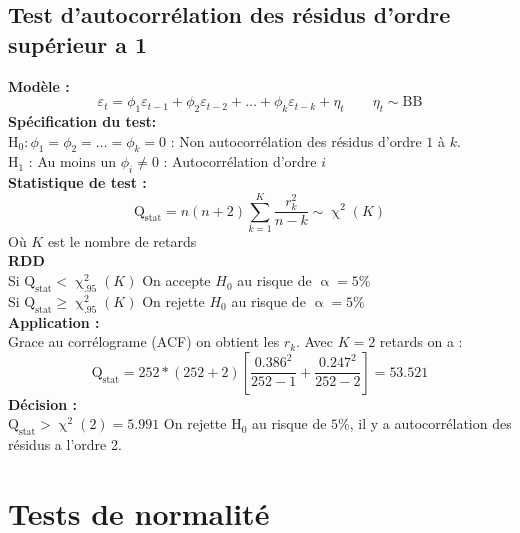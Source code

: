 \documentclass[A4paper]{article}
\begin{document}
\newpage
\subsection{Test d'autocorrélation des résidus d'ordre supérieur a 1}
\textbf{Modèle :}
\begin{equation*}
		\varepsilon_t = \phi_1 \varepsilon_{t-1} + \phi_2 \varepsilon_{t-2} + \ldots + \phi_k \varepsilon_{t-k} + \eta_t \qquad \eta_t \sim \text{BB}
\end{equation*}
\textbf{Spécification du test: } \\
H$_0 : \phi_1 = \phi_2 = \ldots = \phi_k = 0$ : Non autocorrélation des résidus d'ordre $1$ à $k$. \\
H$_1$ : Au moins un $\phi_i \neq 0$ : Autocorrélation d'ordre $i$ \\
\textbf{Statistique de test :}
\begin{equation*}
		\text{Q}_{\text{stat}} = n(n+2) \sum_{k=1}^K \frac{r_k^2}{n-k} \sim \upchi^2(K)
\end{equation*}
Où $K$ est le nombre de retards \\
 \textbf{RDD}\\
Si $\text{Q}_{\text{stat}} < \upchi^2_{.95}(K)$ On accepte $H_0$ au risque de $\upalpha = 5\%$\\
Si $\text{Q}_{\text{stat}} \geq \upchi^2_{.95}(K)$ On rejette $H_0$ au risque de $\upalpha = 5\%$ \\
\textbf{Application :} \\
Grace au corrélograme (ACF) on obtient les $r_k$. Avec $K=2$ retards on a : 
\begin{equation}
		\text{Q}_{\text{stat}} = 252 * (252+2) \left[ \frac{0.386^2}{252-1} + \frac{0.247^2}{252-2} \right] = 53.521
\end{equation}
\textbf{Décision : }\\
$\text{Q}_{\text{stat}} > \upchi^2(2) = 5.991$ On rejette H$_0$ au risque de $5\%$, il y a autocorrélation des résidus a l'ordre 2.
\newpage
\section{Tests de normalité}
\end{document}

